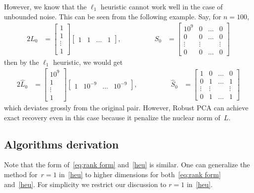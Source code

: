 However, we know that the $\ell_1$ heuristic cannot work well in the case of unbounded noise. This can be seen from the following example. Say, for $n=100$, 
\begin{alignat*}{2}
L_{0}&=\begin{bmatrix} 1\\ 1\\ \vdots \\ 1\end{bmatrix} \begin{bmatrix} 1 & 1 & \dots & 1 \end{bmatrix}, &\qquad \qquad
S_{0} &= \begin{bmatrix} 10^{9} & 0 & \dots & 0\\  0 & 0 & \dots & 0\\ \vdots & \vdots &  & \vdots\\ 0 & 0 & \dots & 0
\end{bmatrix}
\end{alignat*}
%
then by the $\ell_{1}$ heuristic, we would get 
\begin{alignat*}{2}
\hat{L}_{0}&=\begin{bmatrix} 10^9\\ 1\\ \vdots \\ 1\end{bmatrix} \begin{bmatrix} 1 & 10^{-9} & \dots & 10^{-9} \end{bmatrix}, &\qquad \qquad
\hat{S}_{0} &= \begin{bmatrix} 1 & 0 & \dots & 0\\  0 & 1 & \dots & 1\\ \vdots & \vdots &  & \vdots\\ 0 & 1 & \dots & 1
\end{bmatrix}
\end{alignat*}
%
which deviates grossly from the original pair. However, Robust PCA can achieve exact recovery even in this case because it penalize the nuclear norm of~$L$.



\subsection{Algorithms derivation}

Note that the form of~\eqref{eq:rank form} and~\eqref{heu} is similar. One can generalize the method for~$r=1$ in~\eqref{heu}
to higher dimensions for both~\eqref{eq:rank form} and~\eqref{heu}. For simplicity we restrict our discussion to $r=1$ in~\eqref{heu}.

